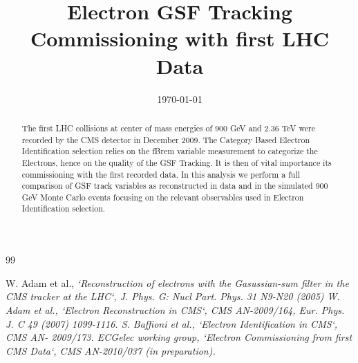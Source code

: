 \documentclass{cmspaper}
\begin{document}
\begin{titlepage}
\date{\today}
\title{Electron GSF Tracking Commissioning with first LHC Data}
\begin{Authlist}

 

\end{Authlist}
\begin{abstract}
The first LHC collisions at center of mass energies of 900 GeV and 2.36 TeV were recorded by the CMS
detector in December 2009. 
The Category Based Electron Identification selection relies on the
fBrem variable measurement to categorize the Electrons, hence on the
quality of the GSF Tracking.
It is then of vital importance its commissioning with the first
recorded data.
In this analysis we perform a full comparison of GSF track variables as reconstructed in data and 
in the simulated 900 GeV Monte Carlo events focusing on the relevant
observables used in Electron Identification selection.

\end{abstract}                          

\end{titlepage}

\clearpage 
\tableofcontents
\clearpage

\linenumbers

\newpage




\pagebreak

\begin{thebibliography} {99}

 W. Adam et al., \it{`Reconstruction of electrons with the Gasussian-sum filter in the CMS tracker at the LHC`}, J. Phys. G: Nucl Part. Phys. 31 N9-N20 (2005)
 W. Adam et al., \it{`Electron Reconstruction in CMS`}, CMS AN-2009/164, Eur. Phys. J. C 49 (2007) 1099-1116.
 S. Baffioni et al., \it{`Electron Identification in CMS`}, CMS AN- 2009/173.
 ECGelec working group, \it{`Electron Commissioning from first CMS Data`}, CMS AN-2010/037 (in preparation).
\end{thebibliography}
\end{document}
